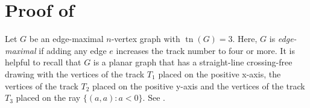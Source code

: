 \documentclass{patmorin}
\DeclareMathOperator{\tr}{tn}
\begin{document}
%
%
%
%
%
%


\section{Proof of }

Let $G$ be an edge-maximal $n$-vertex graph with $\tr(G)=3$.
Here, $G$ is \emph{edge-maximal} if adding any edge $e$ increases the track number to four or more. It is
helpful to recall that $G$ is a planar graph that has a straight-line
crossing-free drawing with the vertices of the track $T_1$ placed on the positive x-axis,
the vertices of the track $T_2$ placed on the positive y-axis and the vertices of
the track $T_3$ placed on the ray $\{(a,a):a<0\}$. See .
\end{document}
